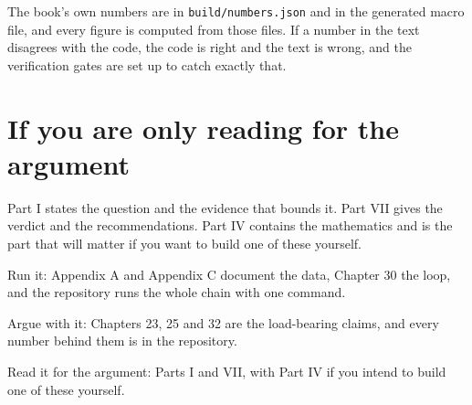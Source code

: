 The book's own numbers are in \texttt{build/numbers.json} and in the
generated macro file, and every figure is computed from those files. If a
number in the text disagrees with the code, the code is right and the text
is wrong, and the verification gates are set up to catch exactly that.

\section*{If you are only reading for the argument}

Part I states the question and the evidence that bounds it. Part VII gives
the verdict and the recommendations. Part IV contains the mathematics and
is the part that will matter if you want to build one of these yourself.

\begin{keytakeaways}
\item Run it: Appendix A and Appendix C document the data, Chapter 30 the
loop, and the repository runs the whole chain with one command.
\item Argue with it: Chapters 23, 25 and 32 are the load-bearing claims,
and every number behind them is in the repository.
\item Read it for the argument: Parts I and VII, with Part IV if you intend
to build one of these yourself.
\end{keytakeaways}
\clearpage
